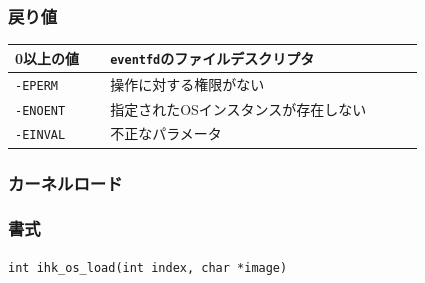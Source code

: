 \documentclass[twoside,11pt,fleqn]{book}
\begin{document}

\subsubsection*{戻り値}{\quad}
\begin{table}[!h]
\footnotesize
\begin{tabular}{|p{0.20\linewidth}|p{0.66\linewidth}|} \hline
0以上の値&\texttt{eventfd}のファイルデスクリプタ\\ \hline
\texttt{-EPERM}&操作に対する権限がない\\ \hline
\texttt{-ENOENT}&指定されたOSインスタンスが存在しない\\ \hline
\texttt{-EINVAL}&不正なパラメータ\\ \hline
\end{tabular}
\vspace{-0em}
\end{table}
\FloatBarrier

\subsubsection{カーネルロード}
\subsubsection*{書式}{\quad} \texttt{int ihk\_os\_load(int index, char *image)}
\end{document}
